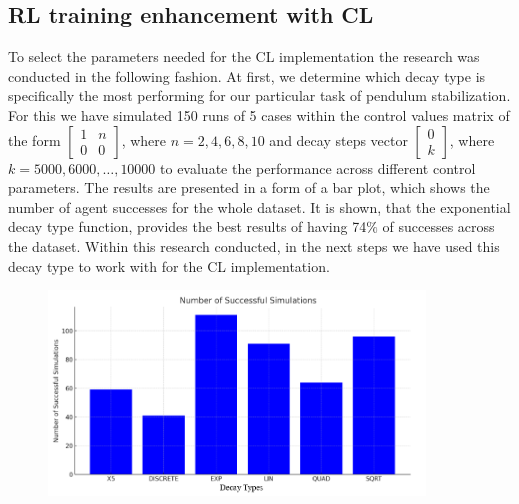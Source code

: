 \subsection{RL training enhancement with CL} \label{subsec: RL training enhancement with CL}
To select the parameters needed for the CL implementation the research was conducted in the following fashion. At first, we determine which decay type is specifically the most performing for our particular task of pendulum stabilization. For this we have simulated 150 runs of 5 cases within the control values matrix of the form 
\(\begin{bmatrix} 1 & n \\ 0 & 0 \end{bmatrix}\), where \(n = 2, 4, 6, 8, 10\) and decay steps vector \(\begin{bmatrix} 0 \\ k \end{bmatrix}\), where \(k = 5000, 6000, \ldots, 10000\) to evaluate the performance across different control parameters. The results are presented in a form of a bar plot, which shows the number of agent successes for the whole dataset. It is shown, that the exponential decay type function, provides the best results of having 74$\%$ of successes across the dataset. Within this research conducted, in the next steps we have used this decay type to work with for the CL implementation. 

\begin{figure}[h]
	\centering
	\includegraphics[width=10cm]{Figures/decay_types_results_comparison.png}
	\caption{}
	\label{fig: decay types comparison}
\end{figure}


